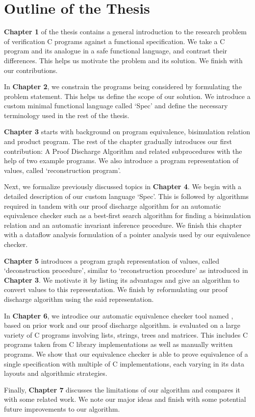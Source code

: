 \vspace{-12px}
\section{Outline of the Thesis}
\vspace{-10px}
\label{sec:outlinethesis}
\textbf{Chapter 1} of the thesis contains a general introduction to the research problem of verification C programs against a functional specification.
We take a C program and its analogue in a safe functional language, and contrast their differences. This helps us motivate the problem and its solution.
We finish with our contributions.

In \textbf{Chapter 2}, we constrain the programs being considered by formulating the problem statement. This helps us define the scope of our solution.
We introduce a custom minimal functional language called `Spec' and define the necessary terminology used in the rest of the thesis.

\textbf{Chapter 3} starts with background on program equivalence, bisimulation relation and product program.
The rest of the chapter gradually introduces our first contribution: A Proof Discharge Algorithm and related subprocedures with the help
of two example programs. We also introduce a program representation of values, called `reconstruction program'.

Next, we formalize previously discussed topics in \textbf{Chapter 4}. We begin with a detailed description of our custom language `Spec'. This is followed by
algorithms required in tandem with our proof discharge algorithm for an automatic equivalence checker such as a best-first search algorithm
for finding a bisimulation relation and an automatic invariant inference procedure. We finish this chapter with a dataflow analysis formulation
of a pointer analysis used by our equivalence checker.

\textbf{Chapter 5} introduces a program graph representation of values, called `deconstruction procedure', similar to `reconstruction procedure' as introduced in \textbf{Chapter 3}.
We motivate it by listing its advantages and give an algorithm to convert values to this representation. We finish by reformulating our
proof discharge algorithm using the said representation.

In \textbf{Chapter 6}, we introdice our automatic equivalence checker tool named \toolName{}, based on prior work and our proof discharge algorithm.
\toolName{} is evaluated on a large variety of C programs involving lists, strings, trees and matrices.
This includes C programs taken from C library implementations as well as manually written programs. We show that our equivalence checker is able
to prove equivalence of a single specification with multiple of C implementations, each varying in its data layouts and algorithmic
strategies.

Finally, \textbf{Chapter 7} discusses the limitations of our algorithm and compares it with some related work. We note our major ideas and finish with
some potential future improvements to our algorithm.